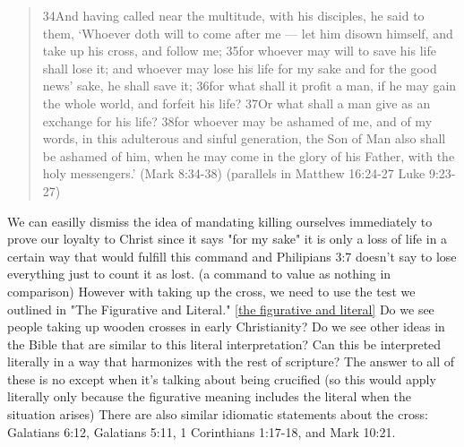 \documentclass[11pt]{article}
\begin{document}
\begin{quote}
34And having called near the multitude, with his disciples, he said to them, ‘Whoever doth will to come after me — let him disown himself, and take up his cross, and follow me; 35for whoever may will to save his life shall lose it; and whoever may lose his life for my sake and for the good news’ sake, he shall save it; 36for what shall it profit a man, if he may gain the whole world, and forfeit his life? 37Or what shall a man give as an exchange for his life? 38for whoever may be ashamed of me, and of my words, in this adulterous and sinful generation, the Son of Man also shall be ashamed of him, when he may come in the glory of his Father, with the holy messengers.’ (Mark 8:34-38) (parallels in Matthew 16:24-27 Luke 9:23-27)
\end{quote}

We can easilly dismiss the idea of mandating killing ourselves immediately to prove our loyalty to Christ since it says "for my sake" it is only a loss of life in a certain way that would fulfill this command and Philipians 3:7 doesn't say to lose everything just to count it as lost. (a command to value as nothing in comparison) However with taking up the cross, we need to use the test we outlined in "The Figurative and Literal." \ref{the figurative and literal} Do we see people taking up wooden crosses in early Christianity? Do we see other ideas in the Bible that are similar to this literal interpretation? Can this be interpreted literally in a way that harmonizes with the rest of scripture? The answer to all of these is no except when it's talking about being crucified (so this would apply literally only because the figurative meaning includes the literal when the situation arises) There are also similar idiomatic statements about the cross: Galatians 6:12, Galatians 5:11, 1 Corinthians 1:17-18, and Mark 10:21.
\end{document}
